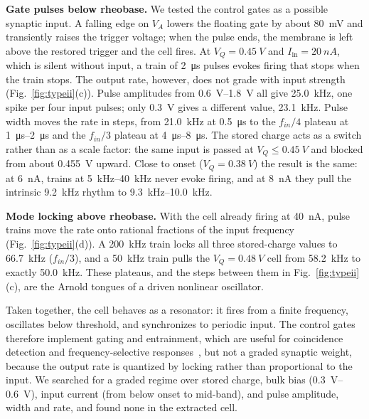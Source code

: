 \documentclass[a4paper,fleqn]{cas-dc}
\begin{document}
\textbf{Gate pulses below rheobase.} We tested the control gates as a possible synaptic input. A falling edge on $V_A$ lowers the floating gate by about \SI{80}{mV} and transiently raises the trigger voltage; when the pulse ends, the membrane is left above the restored trigger and the cell fires. At $V_Q=\SI{0.45}{V}$ and $I_{\mathrm{in}}=\SI{20}{nA}$, which is silent without input, a train of \SI{2}{\micro\second} pulses evokes firing that stops when the train stops. The output rate, however, does not grade with input strength (Fig.~\ref{fig:typeii}(c)). Pulse amplitudes from \SIrange{0.6}{1.8}{V} all give \SI{25.0}{kHz}, one spike per four input pulses; only \SI{0.3}{V} gives a different value, \SI{23.1}{kHz}. Pulse width moves the rate in steps, from \SI{21.0}{kHz} at \SI{0.5}{\micro\second} to the $f_{in}/4$ plateau at \SIrange{1}{2}{\micro\second} and the $f_{in}/3$ plateau at \SIrange{4}{8}{\micro\second}. The stored charge acts as a switch rather than as a scale factor: the same input is passed at $V_Q\le\SI{0.45}{V}$ and blocked from about \SI{0.455}{V} upward. Close to onset ($V_Q=\SI{0.38}{V}$) the result is the same: at \SI{6}{nA}, trains at \SIrange{5}{40}{kHz} never evoke firing, and at \SI{8}{nA} they pull the intrinsic \SI{9.2}{kHz} rhythm to \SIrange{9.3}{10.0}{kHz}.

\textbf{Mode locking above rheobase.} With the cell already firing at \SI{40}{nA}, pulse trains move the rate onto rational fractions of the input frequency (Fig.~\ref{fig:typeii}(d)). A \SI{200}{kHz} train locks all three stored-charge values to \SI{66.7}{kHz} ($f_{in}/3$), and a \SI{50}{kHz} train pulls the $V_Q=\SI{0.48}{V}$ cell from \SI{58.2}{kHz} to exactly \SI{50.0}{kHz}. These plateaus, and the steps between them in Fig.~\ref{fig:typeii}(c), are the Arnold tongues of a driven nonlinear oscillator.

Taken together, the cell behaves as a resonator: it fires from a finite frequency, oscillates below threshold, and synchronizes to periodic input. The control gates therefore implement gating and entrainment, which are useful for coincidence detection and frequency-selective responses~\cite{izhikevich2007}, but not a graded synaptic weight, because the output rate is quantized by locking rather than proportional to the input. We searched for a graded regime over stored charge, bulk bias (\SIrange{0.3}{0.6}{V}), input current (from below onset to mid-band), and pulse amplitude, width and rate, and found none in the extracted cell.

\end{document}
